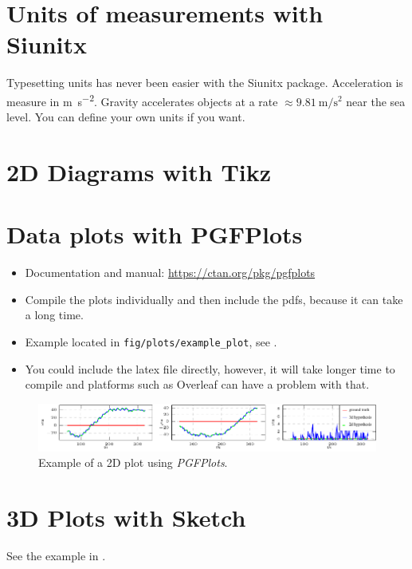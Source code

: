 \section{Units of measurements with Siunitx}

Typesetting units has never been easier with the Siunitx package.
Acceleration is measure in \si{\meter\per\second\squared}.
Gravity accelerates objects at a rate $\approx \SI{9.81}{\meter\per\second\squared}$ near the sea level.
You can define your own units if you want.

\section{2D Diagrams with Tikz}

\section{Data plots with PGFPlots}

\begin{itemize}
  \item Documentation and manual: \url{https://ctan.org/pkg/pgfplots}
  \item Compile the plots individually and then include the pdfs, because it can take a long time.
  \item Example located in \texttt{fig/plots/example\_plot}, see .
  \item You could include the latex file directly, however, it will take longer time to compile and platforms such as Overleaf can have a problem with that.
\end{itemize}

\begin{figure}[!h]
  \centering
  \includegraphics[width=1.0\textwidth]{./fig/plots/example_plot/hypotheses.pdf}
  \caption{Example of a 2D plot using \emph{PGFPlots}.}
  \label{fig:pgfplots}
\end{figure}

\section{3D Plots with Sketch}

See the example in .

